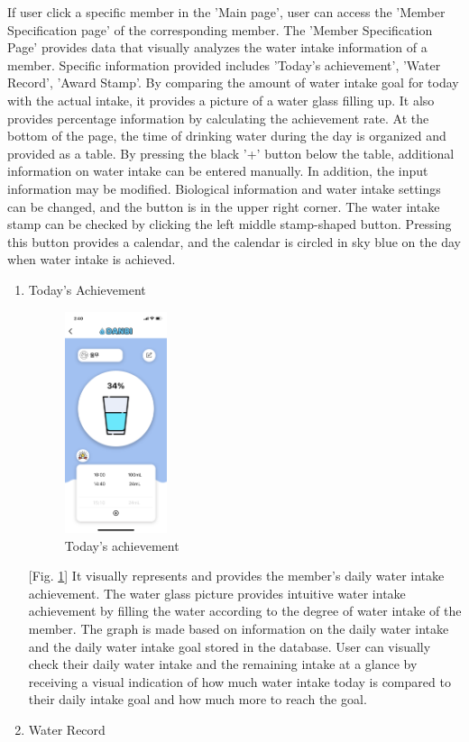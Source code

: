 \documentclass[conference]{IEEEtran}
\begin{document}
\begin{itemize}
 If user click a specific member in the 'Main page', user can access the 'Member Specification page' of the corresponding member. The 'Member Specification Page' provides data that visually analyzes the water intake information of a member. Specific information provided includes 'Today's achievement', 'Water Record', 'Award Stamp'. By comparing the amount of water intake goal for today with the actual intake, it provides a picture of a water glass filling up. It also provides percentage information by calculating the achievement rate. At the bottom of the page, the time of drinking water during the day is organized and provided as a table. By pressing the black '+' button below the table, additional information on water intake can be entered manually. In addition, the input information may be modified. Biological information and water intake settings can be changed, and the button is in the upper right corner. The water intake stamp can be checked by clicking the left middle stamp-shaped button. Pressing this button provides a calendar, and the calendar is circled in sky blue on the day when water intake is achieved.

\begin{enumerate}
\setlength{\parindent}{2ex}
\item Today's Achievement

\par \begin{figure}[h!]
\includegraphics[width=3cm]{page/specificPet.png}
\centering
\caption{Today's achievement}
\label{fig:specPet}
\end{figure}


[Fig. \ref{fig:specPet}] It visually represents and provides the member's daily water intake achievement. The water glass picture provides intuitive water intake achievement by filling the water according to the degree of water intake of the member. The graph is made based on information on the daily water intake and the daily water intake goal stored in the database. User can visually check their daily water intake and the remaining intake at a glance by receiving a visual indication of how much water intake today is compared to their daily intake goal and how much more to reach the goal.
\item Water Record


\end{enumerate}
\end{itemize}
\end{document}
